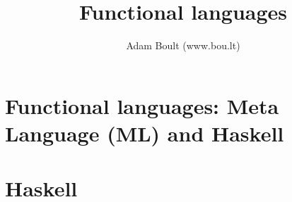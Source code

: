 \documentclass[oneside]{book}
\begin{document}
\author{Adam Boult (www.bou.lt)}
\title{Functional languages}
\maketitle

\setcounter{tocdepth}{0}
\tableofcontents



\part{Functional languages: Meta Language (ML) and Haskell}

\part{Haskell}
\end{document}
